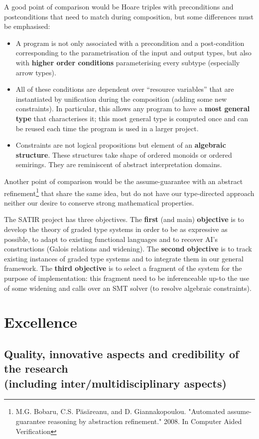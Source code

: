 \documentclass{article}[11pt]
\begin{document}
A good point of comparison would be Hoare triples with preconditions and postconditions that need to match during composition, but some differences must be emphasised:
\begin{itemize}
\item A program is not only associated with a precondition and a post-condition corresponding to the parametrisation of the input and output types, but also with {\bf higher order conditions} parameterising every subtype (especially arrow types).
\item All of these conditions are dependent over ``resource variables'' that are instantiated by unification during the composition (adding some new constraints). In particular, this allows any program to have a {\bf most general type} that characterises it; this most general type is computed once and can be reused each time the program is used in a larger project.
\item Constraints are not logical propositions but element of an {\bf algebraic structure}. These structures take shape of ordered monoids or ordered semirings. They are reminiscent of abstract interpretation domains.
\end{itemize}
Another point of comparison would be the assume-guarantee with an abstract refinement\footnote{M.G. Bobaru, C.S. Păsăreanu, and D. Giannakopoulou. "Automated assume-guarantee reasoning by abstraction refinement." 2008. In Computer Aided Verification} that share the same idea, but do not have our type-directed approach neither our desire to conserve strong mathematical properties.

The SATIR project has three objectives. The {\bf first} (and main) {\bf objective} is to develop the theory of graded type systems in order to be as expressive as possible, to adapt to existing functional languages and to recover AI's constructions (Galois relations and widening). The {\bf second objective} is to track existing instances of graded type systems and to integrate them in our general framework. The {\bf third objective} is to select a fragment of the system for the purpose of implementation: this fragment need to be inferenceable up-to the use of some widening and calls over an SMT solver (to resolve algebraic constraints).

\section{Excellence}
\subsection{Quality, innovative aspects and credibility of the research\\  (including inter/multidisciplinary aspects)}
\end{document}
